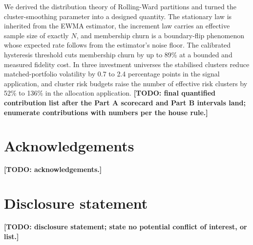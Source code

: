 \documentclass[11pt]{article}
\theoremstyle{remark}
\newcommand{\TODO}[1]{\textbf{[TODO: #1]}}
\begin{document}
We derived the distribution theory of Rolling-Ward partitions and turned the
cluster-smoothing parameter into a designed quantity. The stationary law is
inherited from the EWMA estimator, the increment law carries an effective
sample size of exactly $N$, and membership churn is a boundary-flip
phenomenon whose expected rate follows from the estimator's noise floor. The
calibrated hysteresis threshold cuts membership churn by up to 89\% at a
bounded and measured fidelity cost. In three investment universes the
stabilised clusters reduce matched-portfolio volatility by 0.7 to 2.4
percentage points in the signal application, and cluster risk budgets raise
the number of effective risk clusters by 52\% to 136\% in the allocation
application. \TODO{final quantified contribution list after the Part A
scorecard and Part B intervals land; enumerate contributions with numbers per
the house rule.}



\section*{Acknowledgements}
\TODO{acknowledgements.}

\section*{Disclosure statement}
\TODO{disclosure statement; state no potential conflict of interest, or list.}
\end{document}
